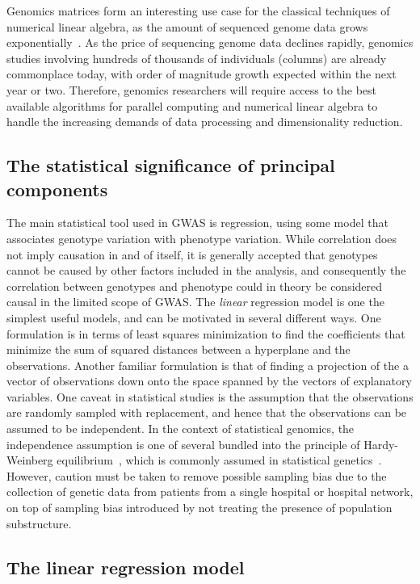 \documentclass[review]{siamart0516}
\begin{document}
Genomics matrices form an interesting use case for the classical techniques of
numerical linear algebra, as the amount of sequenced genome data grows
exponentially~\cite{Stephens2015}. As the price of sequencing genome data declines
rapidly, genomics studies involving hundreds of thousands of individuals (columns)
are already commonplace today, with order of magnitude growth expected within the next year or two. Therefore, genomics researchers will require access to the best
available algorithms for parallel computing and numerical linear algebra to
handle the increasing demands of data processing and dimensionality reduction.


\subsection{The statistical significance of principal components}

The main statistical tool used in GWAS is regression, using some model that
associates genotype variation with phenotype variation.
While correlation does not imply causation in and of itself, it is generally
accepted that genotypes cannot be caused by other factors included in the
analysis, and consequently the correlation between genotypes and phenotype could
in theory be considered causal in the limited scope of GWAS.
The \emph{linear} regression model is one the simplest useful models, and can be
motivated in several different ways. One formulation is in terms of least squares
minimization to find the coefficients that minimize the sum of squared distances
between a hyperplane and the observations. Another familiar formulation is that
of finding a projection of the a vector of observations down onto the space
spanned by the vectors of explanatory variables.
One caveat in statistical studies is the assumption that the observations are
randomly sampled with replacement, and hence that the observations can be
assumed to be independent. In the context of statistical genomics, the
independence assumption is one of several bundled into the principle of
Hardy-Weinberg equilibrium~\cite{Hardy1908,Weinberg1908}, which is commonly
assumed in statistical genetics~\cite{Laird2011}. However, caution must be taken
to remove possible sampling bias due to the collection of genetic data from
patients from a single hospital or hospital network, on top of sampling bias
introduced by not treating the presence of population substructure.


\subsection{The linear regression model}
\end{document}
